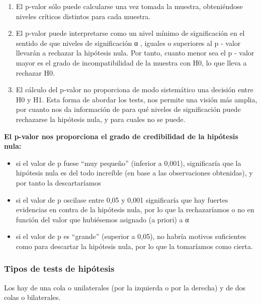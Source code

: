 \documentclass[11pt]{article}
\providecommand{\tightlist}{%
      \setlength{\itemsep}{0pt}\setlength{\parskip}{0pt}}
\begin{document}
\begin{enumerate}
\def\labelenumi{\arabic{enumi}.}
\tightlist
\item
  El p-valor sólo puede calcularse una vez tomada la muestra,
  obteniéndose niveles críticos distintos para cada muestra.
\item
  El p-valor puede interpretarse como un nivel mínimo de significación
  en el sentido de que niveles de significación α , iguales o superiores
  al p - valor llevarán a rechazar la hipótesis nula. Por tanto, cuanto
  menor sea el p - valor mayor es el grado de incompatibilidad de la
  muestra con H0, lo que lleva a rechazar H0.
\item
  El cálculo del p-valor no proporciona de modo sistemático una decisión
  entre H0 y H1. Esta forma de abordar los tests, nos permite una visión
  más amplia, por cuanto nos da información de para qué niveles de
  significación puede rechazarse la hipótesis nula, y para cuales no se
  puede.
\end{enumerate}

\textbf{El p-valor nos proporciona el grado de credibilidad de la
hipótesis nula:}

\begin{itemize}
\tightlist
\item
  si el valor de p fuese ``muy pequeño'' (inferior a 0,001),
  significaría que la hipótesis nula es del todo increíble (en base a
  las observaciones obtenidas), y por tanto la descartaríamos
\item
  si el valor de p oscilase entre 0,05 y 0,001 significaría que hay
  fuertes evidencias en contra de la hipótesis nula, por lo que la
  rechazaríamos o no en función del valor que hubiésemos asignado (a
  priori) a α
\item
  si el valor de p es ``grande'' (superior a 0,05), no habría motivos
  suficientes como para descartar la hipótesis nula, por lo que la
  tomaríamos como cierta.
\end{itemize}

\subsubsection{Tipos de tests de
hipótesis}\label{tipos-de-tests-de-hipuxf3tesis}

Los hay de una cola o unilaterales (por la izquierda o por la derecha) y
de dos colas o bilaterales.
\end{document}
